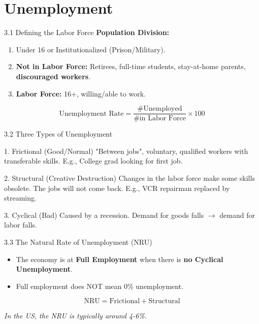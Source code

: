\documentclass[aspectratio=169, 10pt]{beamer}
\begin{document}
\section{Unemployment}

\begin{frame}{3.1 Defining the Labor Force}
    \textbf{Population Division:}
    \begin{enumerate}
        \item Under 16 or Institutionalized (Prison/Military).
        \item \textbf{Not in Labor Force:} Retirees, full-time students, stay-at-home parents, \textbf{discouraged workers}.
        \item \textbf{Labor Force:} 16+, willing/able to work.
    \end{enumerate}
    
    \vspace{0.5cm}
    $$ \text{Unemployment Rate} = \frac{\text{\# Unemployed}}{\text{\# in Labor Force}} \times 100 $$
\end{frame}

\begin{frame}{3.2 Three Types of Unemployment}
    \begin{block}{1. Frictional (Good/Normal)}
    "Between jobs", voluntary, qualified workers with transferable skills. E.g., College grad looking for first job.
    \end{block}
    
    \begin{block}{2. Structural (Creative Destruction)}
    Changes in the labor force make some skills obsolete. The jobs will not come back. E.g., VCR repairman replaced by streaming.
    \end{block}
    
    \begin{block}{3. Cyclical (Bad)}
    Caused by a recession. Demand for goods falls $\rightarrow$ demand for labor falls.
    \end{block}
\end{frame}

\begin{frame}{3.3 The Natural Rate of Unemployment (NRU)}
    \begin{itemize}
        \item The economy is at \textbf{Full Employment} when there is \textbf{no Cyclical Unemployment}.
        \item Full employment does NOT mean 0\% unemployment.
    \end{itemize}
    
    $$ \text{NRU} = \text{Frictional} + \text{Structural} $$
    
    \vspace{0.5cm}
    \textit{In the US, the NRU is typically around 4-6\%.}
\end{frame}
\end{document}
